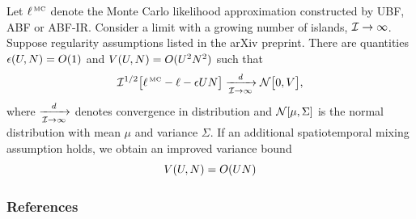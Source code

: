 \documentclass{beamer}
\begin{document}
\begin{frame}
\begin{theorem}  \label{thm:tif}
Let $\ell^{\,\mbox{\tiny MC}}$ denote the Monte Carlo likelihood approximation constructed by UBF, ABF or ABF-IR.
Consider a limit with a growing number of islands, $\mathcal{I}\to\infty$.
Suppose regularity assumptions listed in the arXiv preprint.
There are quantities $\epsilon(U,N) = O(1)$ and $V(U,N)=O(U^2N^2)$ such that
\begin{equation}
\nonumber
\mathcal{I}^{1/2}\big[ \ell^{\,\mbox{\tiny MC}}-\ell-\epsilon UN \big]  \xrightarrow[\mathcal{I} \rightarrow \infty]{d} \mathcal{N}\big[0,V\big],
\end{equation}
where $\xrightarrow[\mathcal{I} \rightarrow \infty]{d}$ denotes convergence in distribution and $\mathcal{N}[\mu,\Sigma]$ is the normal distribution with mean $\mu$ and variance $\Sigma$.
If an additional spatiotemporal mixing assumption holds, we obtain an improved variance bound
\begin{equation}
\nonumber
V(U,N) = O(UN)
\end{equation}
\end{theorem}
\end{frame}




\begin{frame}[allowframebreaks]
\frametitle{References}


\end{frame}
\end{document}
